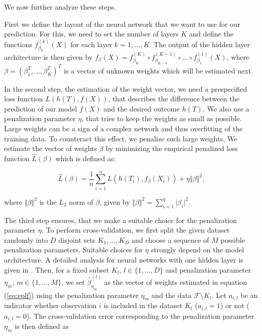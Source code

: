 \documentclass[12pt, a4paper]{scrartcl}
\theoremstyle{definition}
\theoremstyle{plain}
\numberwithin{equation}{section}
\numberwithin{figure}{section}
\numberwithin{table}{section}
\begin{document}
	We now further analyze these steps.

	First we define the layout of the neural network that we want to use for our prediction.
	For this, we need to set the number of layers $K$ and define the functions $f_{\beta_k}^{(k)}(X)$ for each layer $k = 1, \dots, K$.
	The output of the hidden layer architecture is then given by $f_{\beta}(X) = f_{\beta_K}^{(K)} \circ f_{\beta_{K-1}}^{(K-1)} \circ \dots \circ f_{\beta_1}^{(1)}(X)$, where $\beta = (\beta_1^T, \dots, \beta_K^T)^T$ is a vector of unknown weights which will be estimated next.
	
	In the second step, the estimation of the weight vector, we need a prespecified loss function $L(h(T), f(X))$, that describes the difference between the prediction of our model $f(X)$ and the desired outcome $h(T)$.
	We also use a penalization parameter $\eta$, that tries to keep the weights as small as possible.
	Large weights can be a sign of a complex network and thus overfitting of the training data.
	To counteract this effect, we penalize such large weights.
	We estimate the vector of weights $\beta$ by minimizing the empirical penalized loss function $\hat{L}(\beta)$ which is defined as:
	
	\begin{equation}\label{eq:eplf}
	\hat{L}(\beta) = \frac{1}{n} \sum_{i=1}^n L( h(T_i), f_{\beta}(X_i)) + \eta \Vert \beta \Vert ^2,
	\end{equation}
	
	where $\Vert \beta \Vert ^2$ is the $L_2$ norm of $\beta$, given by $\Vert \beta \Vert ^2 = \sum_{i=1}^q \vert \beta _i \vert ^2.$
	
	The third step ensures, that we make a suitable choice for the penalization parameter $\eta$.
	To perform cross-validation, we first split the given dataset randomly into $D$ disjoint sets $K_1,\dots, K_D$ and choose a sequence of $M$ possible penalization parameters.
	Suitable choices for $\eta$ strongly depend on the model architecture.
	A detailed analysis for neural networks with one hidden layer is given in \citet*{regpar}. 
	Then, for a fixed subset $K_l$, $l \in \{1,\dots,D\}$ and penalization parameter $\eta_m$, $m \in \{1,\dots,M\}$, we set $\hat{\beta}_{\eta_{m}}^{(l)}$ as the vector of weights estimated in equation (\ref{eq:eplf}) using the penalization parameter $\eta_m$ and the data $\mathcal{F} \setminus K_l$.
	Let $a_{i,l}$ be an indicator whether observation $i$ is included in the dataset $K_l$ ($a_{i,l} = 1$) or not ($a_{i,l}=0$).
	The cross-validation error corresponding to the penalization parameter $\eta_m$ is then defined as
	
\end{document}
